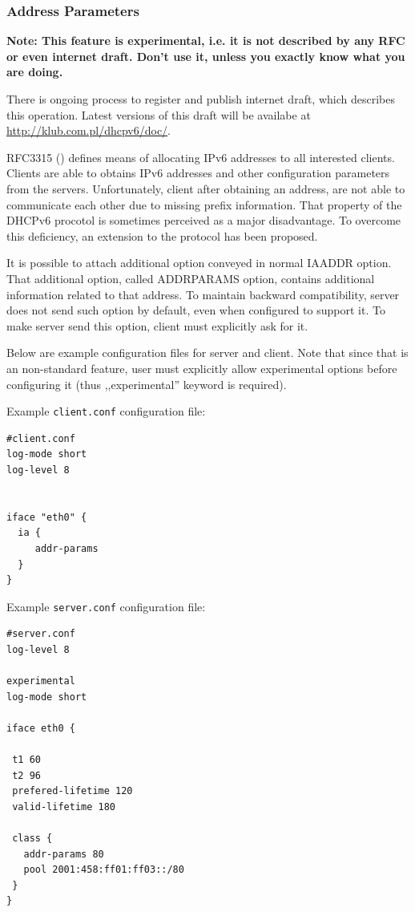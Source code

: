 \subsubsection{Address Parameters}

\textbf{Note: This feature is experimental, i.e. it is not described
by any RFC or even internet draft. Don't use it, unless you exactly
know what you are doing.}

There is ongoing process to register and publish internet draft,
which describes this operation. Latest versions of this draft will be
availabe at \url{http://klub.com.pl/dhcpv6/doc/}.

RFC3315 (\cite{rfc3315}) defines means of allocating IPv6 addresses to
all interested clients. Clients are able to obtains IPv6 addresses and
other configuration parameters from the servers. Unfortunately, client
after obtaining an address, are not able to communicate each other due
to missing prefix information. That property of the DHCPv6 procotol is
sometimes perceived as a major disadvantage. To overcome this
deficiency, an extension to the protocol has been proposed.

It is possible to attach additional option conveyed in normal IAADDR
option. That additional option, called ADDRPARAMS option, contains
additional information related to that address. To maintain backward
compatibility, server does not send such option by default, even when
configured to support it. To make server send this option, client must
explicitly ask for it. 

Below are example configuration files for server and client. Note that
since that is an non-standard feature, user must explicitly allow
experimental options before configuring it (thus ,,experimental''
keyword is required).

Example \verb+client.conf+ configuration file:

\begin{lstlisting}
#client.conf
log-mode short
log-level 8


iface "eth0" {
  ia { 
     addr-params 
  }
}
\end{lstlisting}

Example \verb+server.conf+ configuration file:

\begin{lstlisting}
#server.conf
log-level 8

experimental
log-mode short

iface eth0 {

 t1 60
 t2 96
 prefered-lifetime 120
 valid-lifetime 180

 class {
   addr-params 80
   pool 2001:458:ff01:ff03::/80
 }
}
\end{lstlisting}

